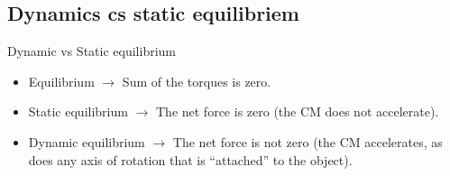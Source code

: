 \documentclass[aspectratio=169,
hyperref={colorlinks,urlcolor=blue}
]{beamer}
\begin{document}



\subsection{Dynamics cs static equilibriem}
\label{subsec:dynamicsvsstaticequilibriem}
\begin{frame}{Dynamic vs Static equilibrium}
\begin{itemize}
\item Equilibrium $\rightarrow$ Sum of the torques is zero.
\item Static equilibrium $\rightarrow$ The net force is zero (the CM does not accelerate).
\item Dynamic equilibrium $\rightarrow$ The net force is not zero (the CM accelerates, as does any axis of rotation that is ``attached'' to the object).
\end{itemize}
\end{frame}


\end{document}
